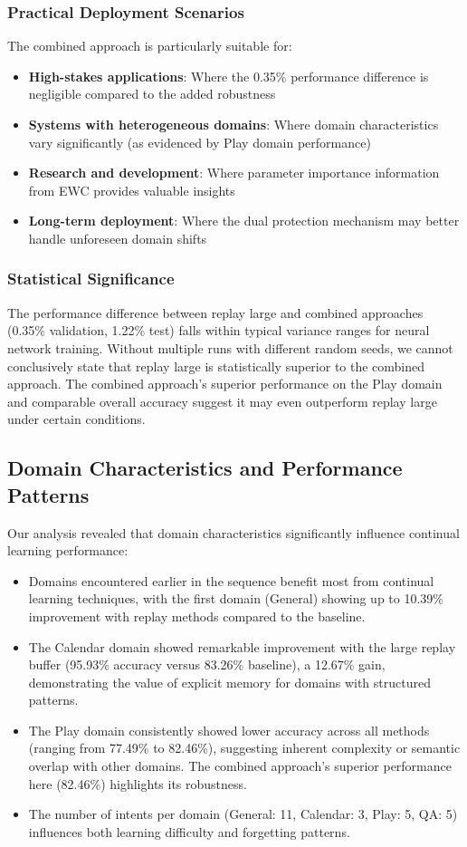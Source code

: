 \documentclass[conference]{IEEEtran}
\begin{document}
\subsubsection{Practical Deployment Scenarios}
The combined approach is particularly suitable for:
\begin{itemize}
    \item \textbf{High-stakes applications}: Where the 0.35\% performance difference is negligible compared to the added robustness
    \item \textbf{Systems with heterogeneous domains}: Where domain characteristics vary significantly (as evidenced by Play domain performance)
    \item \textbf{Research and development}: Where parameter importance information from EWC provides valuable insights
    \item \textbf{Long-term deployment}: Where the dual protection mechanism may better handle unforeseen domain shifts
\end{itemize}

\subsubsection{Statistical Significance}
The performance difference between replay large and combined approaches (0.35\% validation, 1.22\% test) falls within typical variance ranges for neural network training. Without multiple runs with different random seeds, we cannot conclusively state that replay large is statistically superior to the combined approach. The combined approach's superior performance on the Play domain and comparable overall accuracy suggest it may even outperform replay large under certain conditions.

\subsection{Domain Characteristics and Performance Patterns}
Our analysis revealed that domain characteristics significantly influence continual learning performance:

\begin{itemize}
    \item Domains encountered earlier in the sequence benefit most from continual learning techniques, with the first domain (General) showing up to 10.39\% improvement with replay methods compared to the baseline.
    \item The Calendar domain showed remarkable improvement with the large replay buffer (95.93\% accuracy versus 83.26\% baseline), a 12.67\% gain, demonstrating the value of explicit memory for domains with structured patterns.
    \item The Play domain consistently showed lower accuracy across all methods (ranging from 77.49\% to 82.46\%), suggesting inherent complexity or semantic overlap with other domains. The combined approach's superior performance here (82.46\%) highlights its robustness.
    \item The number of intents per domain (General: 11, Calendar: 3, Play: 5, QA: 5) influences both learning difficulty and forgetting patterns.
\end{itemize}
\end{document}
